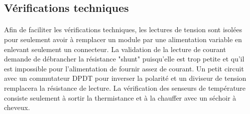 	\subsection{Vérifications techniques}
	\paragraph*{}
	Afin de faciliter les vérifications techniques, les lectures de tension sont isolées pour seulement avoir à remplacer un module par une alimentation variable en enlevant seulement un connecteur. La validation de la lecture de courant demande de débrancher la résistance "shunt" puisqu'elle est trop petite et qu'il est impossible pour l'alimentation de fournir assez de courant. Un petit circuit avec un commutateur DPDT pour inverser la polarité et un diviseur de tension remplacera la résistance de lecture. La vérification des senseurs de température consiste seulement à sortir la thermistance et à la chauffer avec un séchoir à cheveux.